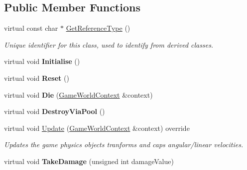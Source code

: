 \subsection*{Public Member Functions}
\begin{DoxyCompactItemize}
\item 
\hypertarget{class_arena_1_1_enemy_a9ebdb58b2731565c36e5c629086227fc}{virtual const char $\ast$ \hyperlink{class_arena_1_1_enemy_a9ebdb58b2731565c36e5c629086227fc}{Get\+Reference\+Type} ()}\label{class_arena_1_1_enemy_a9ebdb58b2731565c36e5c629086227fc}

\begin{DoxyCompactList}\small\item\em Unique identifier for this class, used to identify from derived classes. \end{DoxyCompactList}\item 
\hypertarget{class_arena_1_1_enemy_a210783fb287f22243ec8ac8f75e6a4a9}{virtual void {\bfseries Initialise} ()}\label{class_arena_1_1_enemy_a210783fb287f22243ec8ac8f75e6a4a9}

\item 
\hypertarget{class_arena_1_1_enemy_a726403d5782cbafb305e11c7d90a5e39}{virtual void {\bfseries Reset} ()}\label{class_arena_1_1_enemy_a726403d5782cbafb305e11c7d90a5e39}

\item 
\hypertarget{class_arena_1_1_enemy_a5d1019b8cdc7ef54b59e59d9590a28d6}{virtual void {\bfseries Die} (\hyperlink{struct_arena_1_1_game_world_context}{Game\+World\+Context} \&context)}\label{class_arena_1_1_enemy_a5d1019b8cdc7ef54b59e59d9590a28d6}

\item 
\hypertarget{class_arena_1_1_enemy_aea14958970021ec0008b4a25a1a7949f}{virtual void {\bfseries Destroy\+Via\+Pool} ()}\label{class_arena_1_1_enemy_aea14958970021ec0008b4a25a1a7949f}

\item 
\hypertarget{class_arena_1_1_enemy_a1ce5c09dd7e70bae8a523538a70f183c}{virtual void \hyperlink{class_arena_1_1_enemy_a1ce5c09dd7e70bae8a523538a70f183c}{Update} (\hyperlink{struct_arena_1_1_game_world_context}{Game\+World\+Context} \&context) override}\label{class_arena_1_1_enemy_a1ce5c09dd7e70bae8a523538a70f183c}

\begin{DoxyCompactList}\small\item\em Updates the game physics objects tranforms and caps angular/linear velocities. \end{DoxyCompactList}\item 
\hypertarget{class_arena_1_1_enemy_aaa0e8e8b2a938edac8a9aec8e887952c}{virtual void {\bfseries Take\+Damage} (unsigned int damage\+Value)}\label{class_arena_1_1_enemy_aaa0e8e8b2a938edac8a9aec8e887952c}


\end{DoxyCompactItemize}

